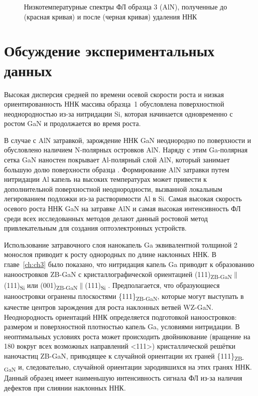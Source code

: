 \begin{figure}[ht]   \caption{Низкотемпературные спектры ФЛ образца 3 (AlN),
полученные до (красная кривая) и после (черная кривая) удаления
ННК}\label{fig:Image_30_2} \end{figure}

\section{Обсуждение экспериментальных данных}\label{sec:ch4/sec5}

Высокая дисперсия средней по времени осевой скорости роста и низкая
ориентированность ННК массива образца~1 обусловлена поверхностной
неоднородностью из-за нитридации Si, которая начинается одновременно с ростом
GaN и продолжается во время роста.

В случае с AlN затравкой, зарождение ННК GaN неоднородно по поверхности и
обусловлено наличием N-полярных островков AlN. Наряду с этим Ga-полярная сетка
GaN наностен покрывает Al-полярный слой AlN, который занимает большую долю
поверхности образца \cite{Auzelle2015}. Формирование AlN затравки путем
нитридации Al капель на высоких температурах может привести к дополнительной
поверхностной неоднородности, вызванной локальным легированием подложки из-за
растворимости Al в Si. Самая высокая скорость осевого роста ННК GaN на затравке
AlN и самая высокая интенсивность ФЛ среди всех исследованных методов делают
данный ростовой метод привлекательным для создания оптоэлектронных устройств.

Использование затравочного слоя нанокапель Ga эквивалентной толщиной 2 монослоя
приводит к росту однородных по длине наклонных ННК. В главе~\cref{ch:ch3} было
показано, что нитридация капель Ga приводит к образованию наноостровков ZB-GaN
с кристаллографической ориентацией
(111)\textsubscript{ZB-GaN}\(\parallel\)(111)\textsubscript{Si} или
(001)\textsubscript{ZB-GaN}\(\parallel\)(111)\textsubscript{Si}
\cite{Fedorov2018}. Предполагается, что образующиеся наноостровки огранены
плоскостями \{111\}\textsubscript{ZB-GaN}, которые могут выступать в качестве
центров зарождения для роста наклонных ветвей WZ-GaN. Неоднородность ориентаций
ННК определяется подготовкой наноостровков: размером и поверхностной плотностью
капель Ga, условиями нитридации. В неоптимальных условиях роста может
происходить двойникование (вращение на 180{\textdegree} вокруг всех возможных
направлений <111>) кристаллической решётки наночастиц ZB-GaN, приводящее к
случайной ориентации их граней \{111\}\textsubscript{ZB-GaN} и, следовательно,
случайной ориентации зародившихся на этих гранях ННК. Данный образец имеет
наименьшую интенсивность сигнала ФЛ из-за наличия дефектов при слиянии
наклонных ННК.

